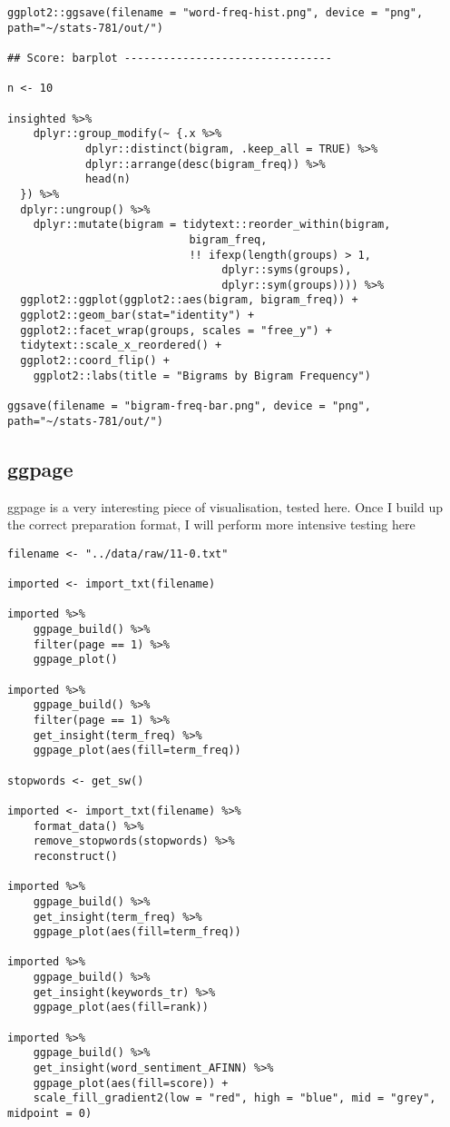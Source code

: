 \documentclass[a4paper, 11pt]{article}
\begin{document}
\begin{verbatim}
ggplot2::ggsave(filename = "word-freq-hist.png", device = "png", path="~/stats-781/out/")

## Score: barplot --------------------------------

n <- 10

insighted %>%
    dplyr::group_modify(~ {.x %>%
		    dplyr::distinct(bigram, .keep_all = TRUE) %>%
		    dplyr::arrange(desc(bigram_freq)) %>%
		    head(n)
  }) %>%
  dplyr::ungroup() %>%
    dplyr::mutate(bigram = tidytext::reorder_within(bigram,
						    bigram_freq,
						    !! ifexp(length(groups) > 1,
							     dplyr::syms(groups),
							     dplyr::sym(groups)))) %>% 
  ggplot2::ggplot(ggplot2::aes(bigram, bigram_freq)) +
  ggplot2::geom_bar(stat="identity") +
  ggplot2::facet_wrap(groups, scales = "free_y") +
  tidytext::scale_x_reordered() +
  ggplot2::coord_flip() +
    ggplot2::labs(title = "Bigrams by Bigram Frequency")

ggsave(filename = "bigram-freq-bar.png", device = "png", path="~/stats-781/out/")
\end{verbatim}

\subsection{ggpage}
\label{sec:orgb43007f}
ggpage is a very interesting piece of visualisation, tested here. Once I build up the correct preparation format, I will perform more intensive testing here
\begin{verbatim}
filename <- "../data/raw/11-0.txt"

imported <- import_txt(filename) 

imported %>%
    ggpage_build() %>%
    filter(page == 1) %>%
    ggpage_plot()

imported %>%
    ggpage_build() %>%
    filter(page == 1) %>%
    get_insight(term_freq) %>%
    ggpage_plot(aes(fill=term_freq))

stopwords <- get_sw()

imported <- import_txt(filename) %>%
    format_data() %>%
    remove_stopwords(stopwords) %>%
    reconstruct()

imported %>%
    ggpage_build() %>%
    get_insight(term_freq) %>%
    ggpage_plot(aes(fill=term_freq))

imported %>%
    ggpage_build() %>%
    get_insight(keywords_tr) %>%
    ggpage_plot(aes(fill=rank))

imported %>%
    ggpage_build() %>%
    get_insight(word_sentiment_AFINN) %>%
    ggpage_plot(aes(fill=score)) +
    scale_fill_gradient2(low = "red", high = "blue", mid = "grey", midpoint = 0)
\end{verbatim}
\end{document}
